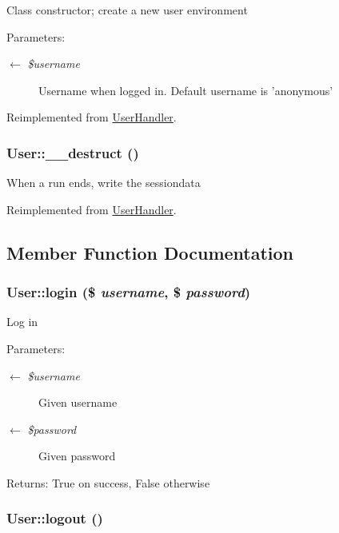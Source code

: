 Class constructor; create a new user environment

\begin{Desc}
\item[Parameters:]
\begin{description}
\item[\mbox{$\leftarrow$} {\em \$username}]Username when logged in. Default username is 'anonymous' \end{description}
\end{Desc}


Reimplemented from \hyperlink{classUserHandler_624054e9693139a3fe5af0ef3b757f04}{UserHandler}.\hypertarget{classUser_ccd20149a7414612c1505e022eb63ffc}{
\subsubsection{\setlength{\rightskip}{0pt plus 5cm}User::\_\-\_\-destruct ()}}
\label{classUser_ccd20149a7414612c1505e022eb63ffc}


When a run ends, write the sessiondata 

Reimplemented from \hyperlink{classUserHandler_3e1f6381ed79caf6e1a255fb0a9cc386}{UserHandler}.

\subsection{Member Function Documentation}
\hypertarget{classUser_2c4fae5935ebf84e787126795bf42988}{
\subsubsection{\setlength{\rightskip}{0pt plus 5cm}User::login (\$ {\em username}, \$ {\em password})}}
\label{classUser_2c4fae5935ebf84e787126795bf42988}


Log in

\begin{Desc}
\item[Parameters:]
\begin{description}
\item[\mbox{$\leftarrow$} {\em \$username}]Given username \item[\mbox{$\leftarrow$} {\em \$password}]Given password \end{description}
\end{Desc}
\begin{Desc}
\item[Returns:]True on success, False otherwise \end{Desc}
\hypertarget{classUser_06ed977c877b02b420233d4f18a6a668}{
\subsubsection{\setlength{\rightskip}{0pt plus 5cm}User::logout ()}}
\label{classUser_06ed977c877b02b420233d4f18a6a668}



